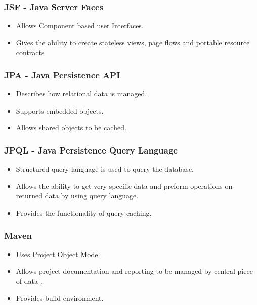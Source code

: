 \documentclass[12pt, oneside]{article}
\begin{document}
		\subsubsection{JSF - Java Server Faces}
			\begin{itemize}
				\item Allows Component based user Interfaces.
				\item Gives the ability to create stateless views, page flows and portable resource contracts
			\end{itemize}
			
		\subsubsection{JPA - Java Persistence API}
			\begin{itemize}
				\item Describes how relational data is managed.
				\item Supports embedded objects.
				\item Allows shared objects to be cached.
			\end{itemize}
			
		\subsubsection{JPQL - Java Persistence Query Language}
			\begin{itemize}
				\item Structured query language is used to query the database.
				\item Allows the ability to get very specific data and preform operations on returned data by using query language.
				\item Provides the functionality of query caching.
			\end{itemize}						
		
		\subsubsection{Maven}
			\begin{itemize}
				 \item Uses Project Object Model.
				 \item Allows project documentation and reporting to be managed by central piece of data .
				 \item Provides build environment.
			\end{itemize}
			
\end{document}

